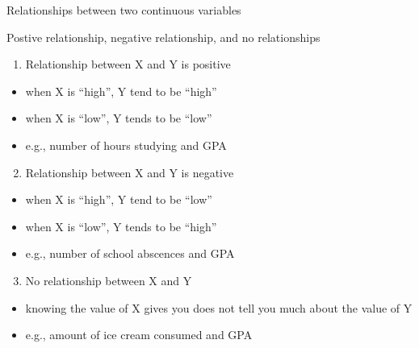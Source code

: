 \documentclass[
  8pt,
  ignorenonframetext,
  dvipsnames]{beamer}
\providecommand{\tightlist}{%
  \setlength{\itemsep}{0pt}\setlength{\parskip}{0pt}}
\let\olditem\item
\renewcommand{\item}{%
  \olditem\vspace{4pt}
}
\begin{document}
\begin{frame}{Relationships between two continuous variables}
\protect\hypertarget{relationships-between-two-continuous-variables}{}

Postive relationship, negative relationship, and no relationships

\medskip

\begin{enumerate}
\tightlist
\item
  Relationship between X and Y is positive
\end{enumerate}

\begin{itemize}
\tightlist
\item
  when X is ``high'', Y tend to be ``high''
\item
  when X is ``low'', Y tends to be ``low''
\item
  e.g., number of hours studying and GPA
\end{itemize}

\medskip

\begin{enumerate}
\setcounter{enumi}{1}
\tightlist
\item
  Relationship between X and Y is negative
\end{enumerate}

\begin{itemize}
\tightlist
\item
  when X is ``high'', Y tend to be ``low''
\item
  when X is ``low'', Y tends to be ``high''
\item
  e.g., number of school abscences and GPA
\end{itemize}

\medskip

\begin{enumerate}
\setcounter{enumi}{2}
\tightlist
\item
  No relationship between X and Y
\end{enumerate}

\begin{itemize}
\tightlist
\item
  knowing the value of X gives you does not tell you much about the
  value of Y
\item
  e.g., amount of ice cream consumed and GPA
\end{itemize}

\end{frame}
\end{document}
